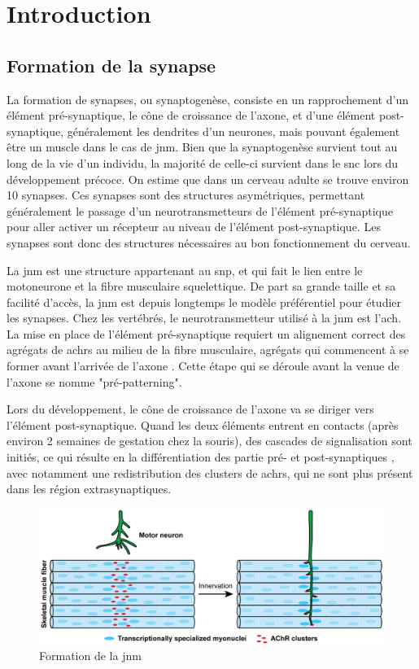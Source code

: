 \chapter{Introduction}

\section{Formation de la synapse}
	\label{sec:IntroSynapse}
	La formation de synapses, ou synaptogenèse, consiste en un rapprochement d'un élément pré-synaptique, le cône de croissance de l'axone, et d'une élément post-synaptique, généralement les dendrites d'un neurones, mais pouvant également être un muscle dans le cas de \gls{jnm}. Bien que la synaptogenèse survient tout au long de la vie d'un individu, la majorité de celle-ci survient dans le \gls{snc} lors du développement précoce. On estime que dans un cerveau adulte se trouve environ 10	synapses. Ces synapses sont des structures asymétriques, permettant généralement le passage d'un neurotransmetteurs de l'élément pré-synaptique pour aller activer un récepteur au niveau de l'élément post-synaptique. Les synapses sont donc des structures nécessaires au bon fonctionnement du cerveau. 
	
	La \gls{jnm} est une structure appartenant au \gls{snp}, et qui fait le lien entre le motoneurone et la fibre musculaire squelettique. De part sa grande taille et sa facilité d'accès, la \gls{jnm} est depuis longtemps le modèle préférentiel pour étudier les synapses. Chez les vertébrés, le neurotransmetteur utilisé à la \gls{jnm} est l'\gls{ach}. La mise en place de l'élément pré-synaptique requiert un alignement correct des agrégats de \glspl{achr} au milieu de la fibre musculaire, agrégats qui commencent à se former avant l'arrivée de l'axone \cite{Wu2010a, Gordon2012}. Cette étape qui se déroule avant la venue de l'axone se nomme "pré-patterning".
	
	Lors du développement, le cône de croissance de l'axone va se diriger vers l'élément post-synaptique. Quand les deux éléments entrent en contacts (après environ 2 semaines de gestation chez la souris), des cascades de signalisation sont initiés, ce qui résulte en la différentiation des partie pré- et post-synaptiques \cite{Sanes1999}, avec notamment une redistribution des clusters de \glspl{achr}, qui ne sont plus présent dans les région extrasynaptiques.
	
	\begin{figure}
		\includegraphics[width=\textwidth]{./Images/formation_jnm.png}
		
		\caption{Formation de la \gls{jnm}}
		\label{fig:FormaJNM}
	\end{figure}
	\clearpage
	
